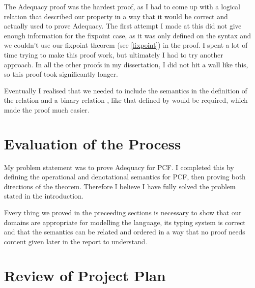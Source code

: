 The Adequacy proof was the hardest proof, as I had to come up with a logical relation that described our property in a way that it would be correct and actually used to prove Adequacy. The first attempt I made at this did not give enough information for the fixpoint case, as it was only defined on the syntax and we couldn't use our fixpoint theorem (see \ref{fixpoint}) in the proof. I spent a lot of time trying to make this proof work, but ultimately I had to try another approach. In all the other  proofs in my dissertation, I did not hit a wall like this, so this proof took significantly longer.

Eventually I realised that we needed to include the semantics in the definition of the relation and a binary relation , like that defined by  \citep{Streicher06} would be required, which made the proof much easier.

\section{Evaluation of the Process} 
My problem statement was to prove Adequacy for PCF. I completed this by defining the operational and denotational semantics for PCF, then proving both directions of the theorem. Therefore I believe I have fully solved the problem stated in the introduction. 

Every thing we proved in the preceeding sections is necessary to show that our domains are appropriate for modelling the language, its typing system is correct and that the semantics can be related and ordered in a way that no proof needs content given later in the report to understand. 

\section{Review of Project Plan}


